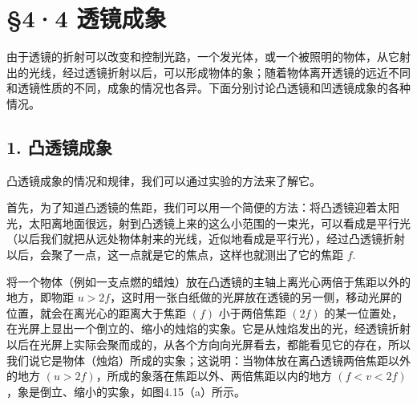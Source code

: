 \section{§4·4 透镜成象}

由于透镜的折射可以改变和控制光路，一个发光体，或一个被照明的物体，从它射出的光线，经过透镜折射以后，可以形成物体的象；随着物体离开透镜的远近不同和透镜性质的不同，成象的情况也各异。下面分别讨论凸透镜和凹透镜成象的各种情况。

\subsection{1. 凸透镜成象}

凸透镜成象的情况和规律，我们可以通过实验的方法来了解它。

首先，为了知道凸透镜的焦距，我们可以用一个简便的方法：将凸透镜迎着太阳光，太阳离地面很远，射到凸透镜上来的这么小范围的一束光，可以看成是平行光
（以后我们就把从远处物体射来的光线，近似地看成是平行光），经过凸透镜折射以后，会聚了一点，这一点就是它的焦点，这样也就测出了它的焦距
\(f\).

将一个物体（例如一支点燃的蜡烛）放在凸透镜的主轴上离光心两倍于焦距以外的地方，即物距
\(u > 2f\)，这时用一张白纸做的光屏放在透镜的另一侧，移动光屏的位置，就会在离光心的距离大于焦距
\((f)\) 小于两倍焦距 \((2f)\)
的某一位置处，在光屏上显出一个倒立的、缩小的烛焰的实象。它是从烛焰发出的光，经透镜折射以后在光屏上实际会聚而成的，从各个方向向光屏看去，都能看见它的存在，所以我们说它是物体（烛焰）所成的实象；这说明：当物体放在离凸透镜两倍焦距以外的地方
\((u > 2f)\)，所成的象落在焦距以外、两倍焦距以内的地方 \((f<v<2f)\)
，象是倒立、缩小的实象，如图4.15（a）所示。

